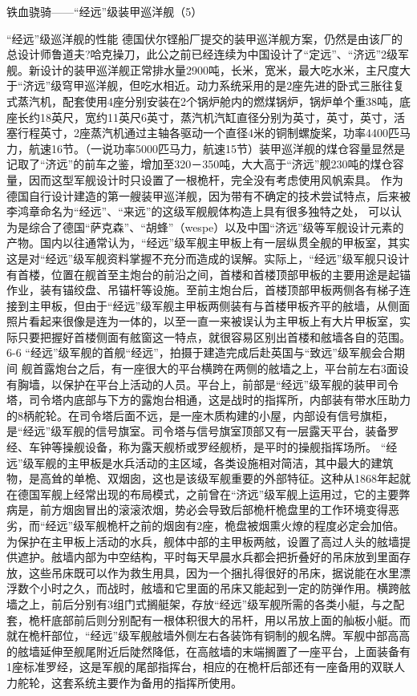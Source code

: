 \documentclass[12pt,UTF8]{ctexbook}
\begin{document}
铁血骁骑——“经远”级装甲巡洋舰（5）

“经远”级巡洋舰的性能
德国伏尔铿船厂提交的装甲巡洋舰方案，仍然是由该厂的总设计师鲁道夫?哈克操刀，此公之前已经连续为中国设计了“定远”、“济远”2级军舰。新设计的装甲巡洋舰正常排水量2900吨，长米，宽米，最大吃水米，主尺度大于“济远”级穹甲巡洋舰，但吃水相近。动力系统采用的是2座先进的卧式三胀往复式蒸汽机，配套使用4座分别安装在2个锅炉舱内的燃煤锅炉，锅炉单个重38吨，底座长约18英尺，宽约11英尺6英寸，蒸汽机汽缸直径分别为英寸，英寸，英寸，活塞行程英寸，2座蒸汽机通过主轴各驱动一个直径4米的铜制螺旋桨，功率4400匹马力，航速16节。（一说功率5000匹马力，航速15节）装甲巡洋舰的煤仓容量显然是记取了“济远”的前车之鉴，增加至320－350吨，大大高于“济远”舰230吨的煤仓容量，因而这型军舰设计时只设置了一根桅杆，完全没有考虑使用风帆索具。
作为德国自行设计建造的第一艘装甲巡洋舰，因为带有不确定的技术尝试特点，后来被李鸿章命名为“经远”、“来远”的这级军舰舰体构造上具有很多独特之处， 可以认为是综合了德国“萨克森”、“胡蜂”（wespe）以及中国“济远”级等军舰设计元素的产物。国内以往通常认为，“经远”级军舰主甲板上有一层纵贯全舰的甲板室，其实这是对“经远”级军舰资料掌握不充分而造成的误解。实际上，“经远”级军舰只设计有首楼，位置在舰首至主炮台的前沿之间，首楼和首楼顶部甲板的主要用途是起锚作业，装有锚绞盘、吊锚杆等设施。至前主炮台后，首楼顶部甲板两侧各有梯子连接到主甲板，但由于“经远”级军舰主甲板两侧装有与首楼甲板齐平的舷墙，从侧面照片看起来很像是连为一体的，以至一直一来被误认为主甲板上有大片甲板室，实际只要把握好首楼侧面有舷窗这一特点，就很容易区别出首楼和舷墙各自的范围。
6-6
“经远”级军舰的首舰“经远”，拍摄于建造完成后赴英国与“致远”级军舰会合期间
舰首露炮台之后，有一座很大的平台横跨在两侧的舷墙之上，平台前左右3面设有胸墙，以保护在平台上活动的人员。平台上，前部是“经远”级军舰的装甲司令塔，司令塔内底部与下方的露炮台相通，这是战时的指挥所，内部装有带水压助力的8柄舵轮。在司令塔后面不远，是一座木质构建的小屋，内部设有信号旗柜，是“经远”级军舰的信号旗室。司令塔与信号旗室顶部又有一层露天平台，装备罗经、车钟等操舰设备，称为露天舰桥或罗经舰桥，是平时的操舰指挥场所。
“经远”级军舰的主甲板是水兵活动的主区域，各类设施相对简洁，其中最大的建筑物，是高耸的单桅、双烟囱，这也是该级军舰重要的外部特征。这种从1868年起就在德国军舰上经常出现的布局模式，之前曾在“济远”级军舰上运用过，它的主要弊病是，前方烟囱冒出的滚滚浓烟，势必会导致后部桅杆桅盘里的工作环境变得恶劣，而“经远”级军舰桅杆之前的烟囱有2座，桅盘被烟熏火燎的程度必定会加倍。
为保护在主甲板上活动的水兵，舰体中部的主甲板两舷，设置了高过人头的舷墙提供遮护。舷墙内部为中空结构，平时每天早晨水兵都会把折叠好的吊床放到里面存放，这些吊床既可以作为救生用具，因为一个捆扎得很好的吊床，据说能在水里漂浮数个小时之久，而战时，舷墙和它里面的吊床又能起到一定的防弹作用。横跨舷墙之上，前后分别有3组门式搁艇架，存放“经远”级军舰所需的各类小艇，与之配套，桅杆底部前后则分别配有一根体积很大的吊杆，用以吊放上面的舢板小艇。而就在桅杆部位，“经远”级军舰舷墙外侧左右各装饰有铜制的舰名牌。军舰中部高高的舷墙延伸至舰尾附近后陡然降低，在高舷墙的末端搁置了一座平台，上面装备有1座标准罗经，这是军舰的尾部指挥台，相应的在桅杆后部还有一座备用的双联人力舵轮，这套系统主要作为备用的指挥所使用。
\end{document}
